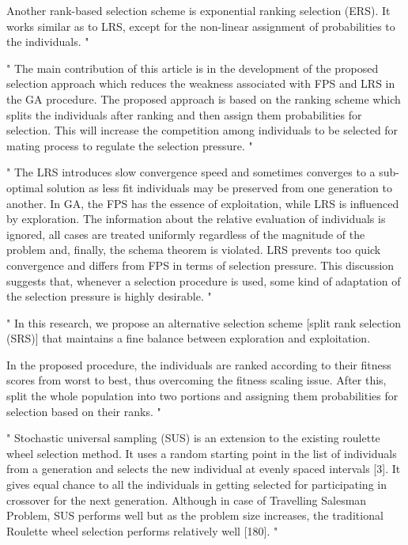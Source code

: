 Another rank-based selection scheme is exponential ranking selection (ERS). It works similar as to LRS, except for the non-linear assignment of probabilities to the individuals.
"\cite{hussain_trade-off_2020}


"
The main contribution of this article is in the development of the proposed selection approach which reduces the weakness associated with FPS and LRS in the GA procedure. The proposed approach is based on the ranking scheme which splits the individuals after ranking and then assign them probabilities for selection. This will increase the competition among individuals to be selected for mating process to regulate the selection pressure.
"\cite{hussain_trade-off_2020}

"
The LRS introduces slow convergence speed and sometimes converges to a sub-optimal solution as less fit individuals may be preserved from one generation to another. In GA, the FPS has the essence of exploitation, while LRS is influenced by exploration. The information about the relative evaluation of individuals is ignored, all cases are treated uniformly regardless of the magnitude of the problem and, finally, the schema theorem is violated. LRS prevents too quick convergence and differs from FPS in terms of selection pressure. This discussion suggests that, whenever a selection procedure is used, some kind of adaptation of the selection pressure is highly desirable.
"\cite{hussain_trade-off_2020}

"
In this research, we propose an alternative selection scheme [split rank selection (SRS)] that maintains a fine balance between exploration and exploitation.

In the proposed procedure, the individuals are ranked according to their fitness scores from worst to best, thus overcoming the fitness scaling issue. After this, split the whole population into two portions and assigning them probabilities for selection based on their ranks.
"\cite{hussain_trade-off_2020}



"
Stochastic universal sampling (SUS) is an extension to the existing roulette wheel selection method. It uses a random starting point in the list of individuals from a generation and selects the new individual at evenly spaced intervals [3]. It gives equal chance to all the individuals in getting selected for participating in crossover for the next generation. Although in case of Travelling Salesman Problem, SUS performs well but as the problem size increases, the traditional Roulette wheel selection performs relatively well [180].
"\cite{katoch_review_2021}

